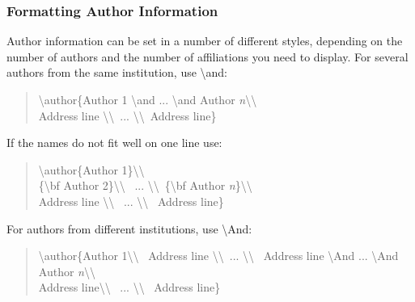 \documentclass[letterpaper]{article}
\begin{document}
\subsubsection{Formatting Author Information}
Author information can be set in a number of different styles, depending on the number of authors and the number of affiliations you need to display. For several authors from the same institution, use \textbackslash and:

\begin{quote}
\begin{small}
\textbackslash author\{Author 1 \textbackslash and  ...  \textbackslash and Author \textit{n}\textbackslash \textbackslash  \\
Address line \textbackslash \textbackslash ~... \textbackslash \textbackslash ~Address line\}
\end{small}
\end{quote}

\noindent If the names do not fit well on one line use:

\begin{quote}
\begin{small}
\textbackslash author\{Author 1\}\textbackslash \textbackslash \\ \{\textbackslash bf Author 2\}\textbackslash \textbackslash ~ 
... \textbackslash \textbackslash ~\{\textbackslash bf Author \textit{n}\}\textbackslash \textbackslash \\
Address line \textbackslash \textbackslash ~ ... \textbackslash \textbackslash ~ Address line\}
\end{small}
\end{quote}

\noindent For authors from different institutions, use \textbackslash And:

\begin{quote}
\begin{small}
\textbackslash author\{Author 1\textbackslash \textbackslash ~ Address line \textbackslash \textbackslash ~...  \textbackslash \textbackslash ~ Address line
\textbackslash And  ...  
\textbackslash And
Author \textit{n}\textbackslash \textbackslash \\ Address line\textbackslash \textbackslash ~
... \textbackslash \textbackslash ~
Address line\}
\end{small}
\end{quote}
\end{document}
